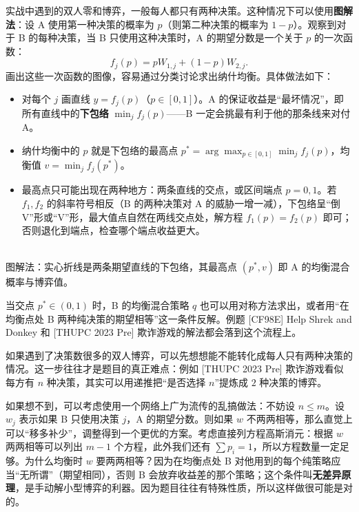 \documentclass[UTF8,a4paper,11pt,oneside,openany,fontset=fandol]{ctexbook}
\theoremstyle{definition}
\begin{document}
实战中遇到的双人零和博弈，一般每人都只有两种决策。这种情况下可以使用\textbf{图解法}：设 A 使用第一种决策的概率为 $p$（则第二种决策的概率为 $1-p$）。观察到对于 B 的每种决策，当 B 只使用这种决策时，A 的期望分数是一个关于 $p$ 的一次函数：
\[
 f_j(p)=pW_{1,j}+(1-p)W_{2,j}.
\]
画出这些一次函数的图像，容易通过分类讨论求出纳什均衡。具体做法如下：
\begin{itemize}
\item 对每个 $j$ 画直线 $y=f_j(p)$（$p\in[0,1]$）。A 的保证收益是“最坏情况”，即所有直线中的\textbf{下包络} $\min_j f_j(p)$——B 一定会挑最有利于他的那条线来对付 A。
\item 纳什均衡中的 $p$ 就是下包络的最高点 $p^*=\arg\max_{p\in[0,1]}\min_j f_j(p)$，均衡值 $v=\min_j f_j(p^*)$。
\item 最高点只可能出现在两种地方：两条直线的交点，或区间端点 $p=0,1$。若 $f_1,f_2$ 的斜率符号相反（B 的两种决策对 A 的威胁一增一减），下包络呈“倒 V”形或“V”形，最大值点自然在两线交点处，解方程 $f_1(p)=f_2(p)$ 即可；否则退化到端点，检查哪个端点收益更大。
\end{itemize}

\begin{center}
\\[2pt]
{\small 图解法：实心折线是两条期望直线的下包络，其最高点 $(p^*,v)$ 即 A 的均衡混合概率与博弈值。}
\end{center}

当交点 $p^*\in(0,1)$ 时，B 的均衡混合策略 $q$ 也可以用对称方法求出，或者用“在均衡点处 B 两种纯决策的期望相等”这一条件反解。例题 [CF98E] Help Shrek and Donkey 和 [THUPC 2023 Pre] 欺诈游戏的解法都会落到这个流程上。

如果遇到了决策数很多的双人博弈，可以先想想能不能转化成每人只有两种决策的情况。这一步往往才是题目的真正难点：例如 [THUPC 2023 Pre] 欺诈游戏看似每方有 $n$ 种决策，其实可以用递推把“是否选择 $n$”提炼成 $2$ 种决策的博弈。

如果想不到，可以考虑使用一个网络上广为流传的乱搞做法：不妨设 $n\le m$。设 $w_j$ 表示如果 B 只使用决策 $j$，A 的期望分数。则如果 $w$ 不两两相等，那么直觉上可以“移多补少”，调整得到一个更优的方案。考虑直接列方程高斯消元：根据 $w$ 两两相等可以列出 $m-1$ 个方程，此外我们还有 $\sum p_i=1$，所以方程数量一定足够。为什么均衡时 $w$ 要两两相等？因为在均衡点处 B 对他用到的每个纯策略应当“无所谓”（期望相同），否则 B 会放弃收益差的那个策略；这个条件叫\textbf{无差异原理}，是手动解小型博弈的利器。因为题目往往有特殊性质，所以这样做很可能是对的。
\end{document}
